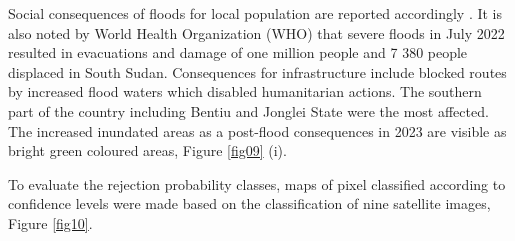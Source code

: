 \documentclass[analytics,article,submit,pdftex,moreauthors]{Definitions/mdpi}
\begin{document}
Social consequences of floods for local population are reported accordingly \cite{ReliefWeb}. It is also noted by World Health Organization (WHO) \cite{WHO2023} that severe floods in July 2022 resulted in evacuations and damage of one million people and 7 380 people displaced in South Sudan. Consequences for infrastructure include blocked routes by increased flood waters which disabled humanitarian actions. The southern part of the country including Bentiu and Jonglei State were the most affected. The increased inundated areas as a post-flood consequences in 2023 are visible as bright green coloured areas, Figure \ref{fig09} (i).

To evaluate the rejection probability classes, maps of pixel classified according to confidence levels were made based on the classification of nine satellite images, Figure \ref{fig10}. 
\end{document}
